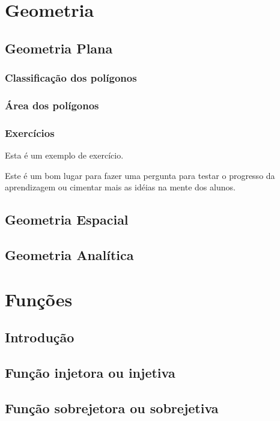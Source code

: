 \documentclass[11pt,fleqn]{book}
\begin{document}
\part{Geometria}
\chapter{Geometria Plana}
\section{Classificação dos polígonos}
    
\section{Área dos polígonos}
    
\section{Exercícios}
        Esta é um exemplo de exercício.
        \begin{exercise}
        Este é um bom lugar para fazer uma pergunta para testar o progresso da aprendizagem ou cimentar mais as idéias na mente dos alunos.
        \end{exercise} 
        
\chapter{Geometria Espacial}
    
\chapter{Geometria Analítica}


\part{Funções}
\chapter{Introdução}

\chapter{Função injetora ou injetiva}

\chapter{Função sobrejetora ou sobrejetiva}
\end{document}
